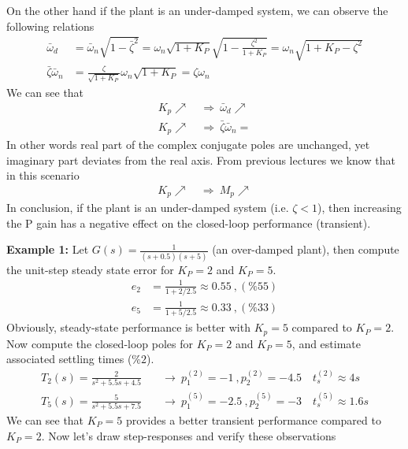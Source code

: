 \documentclass[twoside]{article}
\begin{document}
On the other hand if the plant is an under-damped system, 
we can observe the following relations 
%
\begin{align*}
\bar{\omega}_d &= \bar{\omega}_n \sqrt{1 - \bar{\zeta}^2} = \omega_n
  \sqrt{1 + K_P}  \sqrt{1 - \frac{\zeta^2}{ 1 + K_P } } 
  = \omega_n \sqrt{ 1 + K_P -\zeta^2 } 
\\
\bar{\zeta} \bar{\omega}_n &= \frac{\zeta}{ \sqrt{ 1 + K_P } }
                             \omega_n \sqrt{1 + K_P} = \zeta \omega_n
\end{align*}
%
We can see that
%
  \begin{align*}
    K_p \nearrow \ &\Rightarrow \ \bar{\omega}_d \nearrow \\
   K_p \nearrow \ &\Rightarrow \ \bar{\zeta} \bar{\omega}_n \mathrm{=}
  \end{align*}
%
In other words real part of the complex conjugate poles
are unchanged, yet imaginary part deviates from the real 
axis. From previous lectures we know that in this scenario
%
  \begin{align*}
    K_p \nearrow \ &\Rightarrow \ M_p \nearrow 
  \end{align*}
%
In conclusion, if the plant is an under-damped system (i.e. $\zeta <
1$), then increasing the P gain has a negative effect on 
the closed-loop performance (transient). 

\textbf{Example 1:} Let $G(s) = \frac{1}{(s+0.5)(s+5)}$ (an over-damped
plant), then compute the unit-step steady state error for $K_P = 2$ and $K_P = 5$.
%
\begin{align*}
  e_{2} &= \frac{1}{1 + 2 / 2.5} \approx 0.55 \ , (\%55) 
\\
  e_{5} &= \frac{1}{1 + 5 / 2.5} \approx 0.33 \ , (\%33) 
\end{align*}
%
Obviously, steady-state performance is better with $K_p = 5$
compared to $K_P = 2$. Now compute the closed-loop poles
for $K_P = 2$ and $K_P = 5$, and estimate associated 
settling times ($\%2$).
%
\begin{align*}
  T_2(s) = \frac{2}{s^2 + 5.5 s + 4.5} &\quad \rightarrow \
  p^{(2)}_{1} = -1 \ ,  p^{(2)}_{2} = -4.5  \quad t^{(2)}_s \approx 4
  s 
\\
  T_5(s) = \frac{5}{s^2 + 5.5 s + 7.5} &\quad \rightarrow \
  p^{(5)}_{1} = -2.5 \ ,  p^{(5)}_{2} = -3  \quad t^{(5)}_s \approx
                                         1.6 s 
\end{align*}
%
We can see that $K_P = 5$ provides a better transient performance
compared to $K_P = 2$. Now let's draw step-responses and
verify these observations
\end{document}

